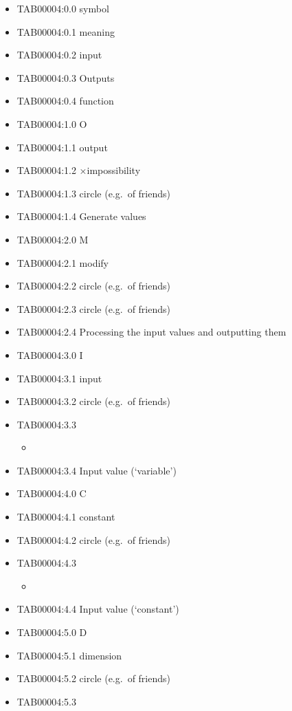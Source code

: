 \begin{itemize}
\item
  TAB00004:0.0 symbol
\item
  TAB00004:0.1 meaning
\item
  TAB00004:0.2 input
\item
  TAB00004:0.3 Outputs
\item
  TAB00004:0.4 function
\item
  TAB00004:1.0 O
\item
  TAB00004:1.1 output
\item
  TAB00004:1.2 ×impossibility
\item
  TAB00004:1.3 circle (e.g.~of friends)
\item
  TAB00004:1.4 Generate values
\item
  TAB00004:2.0 M
\item
  TAB00004:2.1 modify
\item
  TAB00004:2.2 circle (e.g.~of friends)
\item
  TAB00004:2.3 circle (e.g.~of friends)
\item
  TAB00004:2.4 Processing the input values and outputting them
\item
  TAB00004:3.0 I
\item
  TAB00004:3.1 input
\item
  TAB00004:3.2 circle (e.g.~of friends)
\item
  TAB00004:3.3

  \begin{itemize}
  \tightlist
  \item
  \end{itemize}
\item
  TAB00004:3.4 Input value (`variable')
\item
  TAB00004:4.0 C
\item
  TAB00004:4.1 constant
\item
  TAB00004:4.2 circle (e.g.~of friends)
\item
  TAB00004:4.3

  \begin{itemize}
  \tightlist
  \item
  \end{itemize}
\item
  TAB00004:4.4 Input value (`constant')
\item
  TAB00004:5.0 D
\item
  TAB00004:5.1 dimension
\item
  TAB00004:5.2 circle (e.g.~of friends)
\item
  TAB00004:5.3


\end{itemize}

